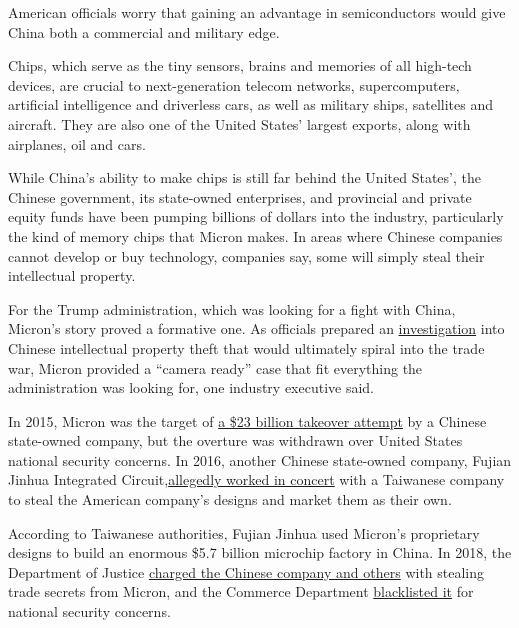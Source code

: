 American officials worry that gaining an advantage in semiconductors
would give China both a commercial and military edge.

Chips, which serve as the tiny sensors, brains and memories of all
high-tech devices, are crucial to next-generation telecom networks,
supercomputers, artificial intelligence and driverless cars, as well as
military ships, satellites and aircraft. They are also one of the United
States' largest exports, along with airplanes, oil and cars.

While China's ability to make chips is still far behind the United
States', the Chinese government, its state-owned enterprises, and
provincial and private equity funds have been pumping billions of
dollars into the industry, particularly the kind of memory chips that
Micron makes. In areas where Chinese companies cannot develop or buy
technology, companies say, some will simply steal their intellectual
property.

For the Trump administration, which was looking for a fight with China,
Micron's story proved a formative one. As officials prepared an
\href{https://ustr.gov/issue-areas/enforcement/section-301-investigations/section-301-china/investigation}{investigation}
into Chinese intellectual property theft that would ultimately spiral
into the trade war, Micron provided a ``camera ready'' case that fit
everything the administration was looking for, one industry executive
said.

In 2015, Micron was the target of
\href{https://www.nytimes.com/2015/07/15/business/international/micron-technology-is-said-to-be-takeover-target-of-chinese-company.html}{a
\$23 billion takeover attempt} by a Chinese state-owned company, but the
overture was withdrawn over United States national security concerns. In
2016, another Chinese state-owned company, Fujian Jinhua Integrated
Circuit,\href{https://www.nytimes.com/2018/06/22/technology/china-micron-chips-theft.html}{allegedly
worked in concert} with a Taiwanese company to steal the American
company's designs and market them as their own.

According to Taiwanese authorities, Fujian Jinhua used Micron's
proprietary designs to build an enormous \$5.7 billion microchip factory
in China. In 2018, the Department of Justice
\href{https://www.reuters.com/article/us-usa-justice-china-espionage/u-s-indicts-chinese-taiwan-firms-for-targeting-micron-trade-secrets-idUSKCN1N65R2}{charged
the Chinese company and others} with stealing trade secrets from Micron,
and the Commerce Department
\href{https://www.nytimes.com/2018/10/29/us/politics/fujian-jinhua-china-sales.html}{blacklisted
it} for national security concerns.

